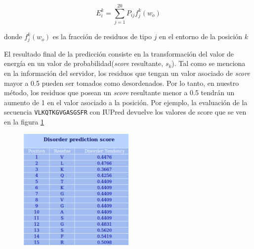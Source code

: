 \begin{equation}\label{modelofinal}
E_i^k = \sum_{j=1}^{20} P_{ij}f_{j}^k(w_o) 
\end{equation}

donde $f_{j}^k(w_o)$ es la fracción de residuos de tipo $j$ en el entorno de la posición $k$


El resultado final de la predicción consiste en la transformación del valor de energía en un valor de probabilidad(\textit{score} resultante, $s_k$).
Tal como se menciona en la información del servidor\cite{dosztanyi2005iupred}, los residuos que tengan un valor asociado de \textit{score} mayor a 0.5 pueden ser tomados como desordenados.
Por lo tanto, en nuestro método, los residuos que posean un \textit{score} resultante menor a 0.5 tendrán un aumento de 1 en el valor asociado a la posición.
Por ejemplo, la evaluación de la secuencia \texttt{VLKQTKGVGASGSFR} con IUPred devuelve los valores de score que se ven en la figura \ref{iupredResults}

\begin{figure}[ht]
\centering
\includegraphics[width=0.5\textwidth]{img/iupredTabla.png} 
\caption{}
\label{iupredResults}
\end{figure}

% 
% 


